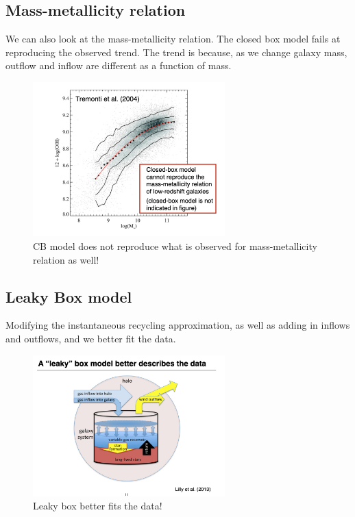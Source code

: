 \documentclass{article}
\begin{document}
\subsection{Mass-metallicity relation}

We can also look at the mass-metallicity relation. The closed box model fails at reproducing the observed trend. The trend is because, as we change galaxy mass, outflow and inflow are different as a function of mass. 

\begin{figure}
    \centering
    \includegraphics[width=0.66\textwidth]{figs/Screen Shot 2021-10-08 at 10.34.28 AM.png}
    \caption{CB model does not reproduce what is observed for mass-metallicity relation as well!}
    \label{fig:mm_cb}
\end{figure}

\subsection{Leaky Box model}

Modifying the instantaneous recycling approximation, as well as adding in inflows and outflows, and we better fit the data. 

\begin{figure}
    \centering
    \includegraphics[width=0.66\textwidth]{figs/Screen Shot 2021-10-08 at 10.42.51 AM.png}
    \caption{Leaky box better fits the data!}
    \label{fig:leaky_box_model}
\end{figure}
\end{document}
